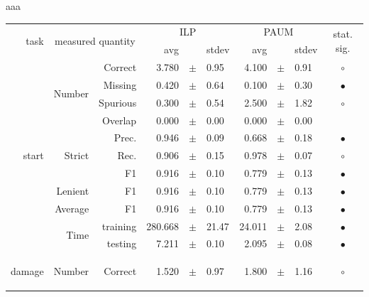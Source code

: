 
aaa

\vspace{1.1cm}


\begin{longtable}{|r|r|r||rcl|rcl|c|}
\hline
\multirow{2}{*}{task} & \multicolumn{2}{|c||}{\multirow{2}{*}{measured quantity}} & \multicolumn{3}{|c|}{ILP} & \multicolumn{3}{|c|}{PAUM} & \multirow{2}{*}{ stat. sig.}\\
\cline{4-9}
  & \multicolumn{2}{|c||}{} &  avg  &    &  stdev  &  avg  &    &  stdev  & \\
\hline
\endhead
\hline
\hline
\multirow{11}{*}{\begin{sideways}start\end{sideways} } & \multirow{4}{*}{Number} &  Correct  & 3.780 &  $\pm$  & 0.95 & 4.100 &  $\pm$  & 0.91 &  $\circ$\\
\cline{3-10}
 &  &  Missing  & 0.420 &  $\pm$  & 0.64 & 0.100 &  $\pm$  & 0.30 &  $\bullet$\\
\cline{3-10}
 &  &  Spurious  & 0.300 &  $\pm$  & 0.54 & 2.500 &  $\pm$  & 1.82 &  $\circ$\\
\cline{3-10}
 &  &  Overlap  & 0.000 &  $\pm$  & 0.00 & 0.000 &  $\pm$  & 0.00 &   \\
\cline{2-10}
 & \multirow{3}{*}{Strict} &  Prec.  & 0.946 &  $\pm$  & 0.09 & 0.668 &  $\pm$  & 0.18 &  $\bullet$\\
\cline{3-10}
 &  &  Rec.  & 0.906 &  $\pm$  & 0.15 & 0.978 &  $\pm$  & 0.07 &  $\circ$\\
\cline{3-10}
 &  &  F1  & 0.916 &  $\pm$  & 0.10 & 0.779 &  $\pm$  & 0.13 &  $\bullet$\\
\cline{2-10}
 & Lenient &  F1  & 0.916 &  $\pm$  & 0.10 & 0.779 &  $\pm$  & 0.13 &  $\bullet$\\
\cline{2-10}
 & Average &  F1  & 0.916 &  $\pm$  & 0.10 & 0.779 &  $\pm$  & 0.13 &  $\bullet$\\
\cline{2-10}
 & \multirow{2}{*}{Time} &  training  & 280.668 &  $\pm$  & 21.47 & 24.011 &  $\pm$  & 2.08 &  $\bullet$\\
\cline{3-10}
 &  &  testing  & 7.211 &  $\pm$  & 0.10 & 2.095 &  $\pm$  & 0.08 &  $\bullet$\\
\hline
\hline
\multirow{11}{*}{\begin{sideways}damage\end{sideways} } & \multirow{4}{*}{Number} &  Correct  & 1.520 &  $\pm$  & 0.97 & 1.800 &  $\pm$  & 1.16 &  $\circ$\\

\end{longtable}
